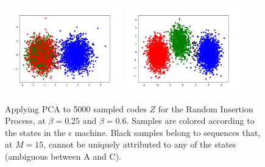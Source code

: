 \documentclass[11pt,letterpaper]{article}
\begin{document}
\begin{figure}
\includegraphics[width=0.45\textwidth]{code/figures/foo_pca_2.png}
\includegraphics[width=0.45\textwidth]{code/figures/foo_pca_3.png}
	\caption{Applying PCA to 5000 sampled codes $Z$ for the Random Insertion Process, at $\beta = 0.25$ and $\beta = 0.6$. Samples are colored according to the states in the $\epsilon$ machine. Black samples belong to sequences that, at $M=15$, cannot be uniquely attributed to any of the states (ambiguous between A and C).}\label{fig:latent}
\end{figure}
\end{document}
